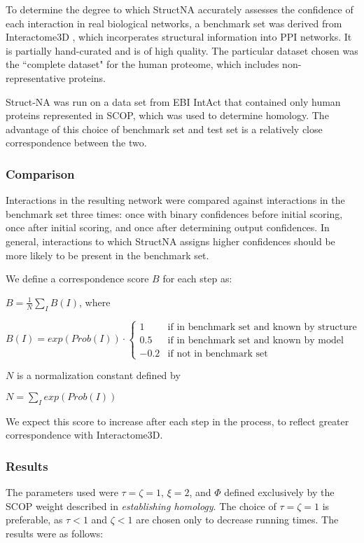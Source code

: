 \documentclass[12pt,twoside]{article}
\begin{document}
To determine the degree to which StructNA accurately assesses the confidence of each interaction in real biological networks, a benchmark set was derived from Interactome3D \cite{interactome3d}, which incorperates structural information into PPI networks. It is partially hand-curated and is of high quality. The particular dataset chosen was the ``complete dataset" for the human proteome, which includes non-representative proteins.

Struct-NA was run on a data set from EBI IntAct \cite{intact} that contained only human proteins represented  in SCOP, which was used to determine homology. The advantage of this choice of benchmark set and test set is a relatively close correspondence between the two.

\subsubsection{Comparison}

Interactions in the resulting network were compared against interactions in the benchmark set three times: once with binary confidences before initial scoring, once after initial scoring, and once after determining output confidences. In general, interactions to which StructNA assigns higher confidences should be more likely to be present in the benchmark set.

We define a correspondence score $B$ for each step as:

$B = \displaystyle \frac{1}{N} \sum_I B(I)$, where

$B(I) = exp(Prob(I)) \cdot \left\{
\begin{array}{ll}
1 & \text{if in benchmark set and known by structure}\\
0.5 & \text{if in benchmark set and known by model}\\
-0.2 & \text{if not in benchmark set}
\end{array} \right.$

$N$ is a normalization constant defined by
 
$N = \displaystyle \sum_I exp(Prob(I))$
 
We expect this score to increase after each step in the process, to reflect greater correspondence with Interactome3D.

\subsubsection{Results}

The parameters used were $\tau = \zeta = 1$, $\xi=2$, and $\Phi$ defined exclusively by the SCOP weight described in \emph{establishing homology}. The choice of $\tau = \zeta = 1$ is preferable, as $\tau < 1$ and $\zeta < 1$ are chosen only to decrease running times. The results were as follows:
\end{document}
